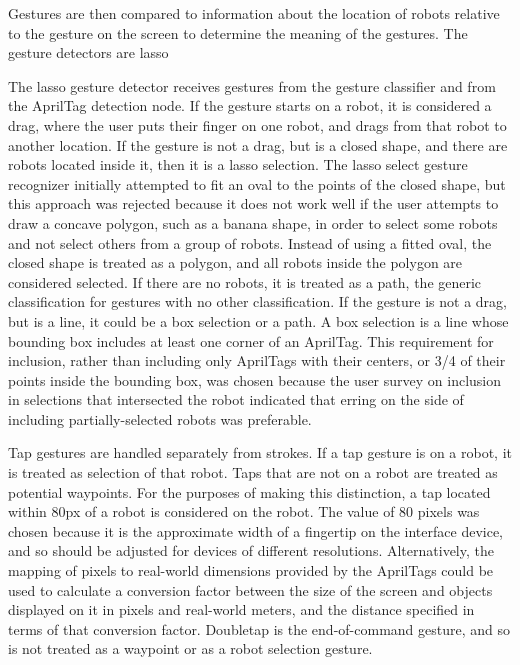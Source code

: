 Gestures are then compared to information about the location of robots relative to the gesture on the screen to determine the meaning of the gestures. 
The gesture detectors are lasso 

The lasso gesture detector receives gestures from the gesture classifier and from the AprilTag detection node. 
If the gesture starts on a robot, it is considered a drag, where the user puts their finger on one robot, and drags from that robot to another location. 
If the gesture is not a drag, but is a closed shape, and there are robots located inside it, then it is a lasso selection. 
The lasso select gesture recognizer initially attempted to fit an oval to the points of the closed shape, but this approach was rejected because it does not work well if the user attempts to draw a concave polygon, such as a banana shape, in order to select some robots and not select others from a group of robots. 
Instead of using a fitted oval, the closed shape is treated as a polygon, and all robots inside the polygon are considered selected. 
If there are no robots, it is treated as a path, the generic classification for gestures with no other classification. 
If the gesture is not a drag, but is a line, it could be a box selection or a path. 
A box selection is a line whose bounding box includes at least one corner of an AprilTag. 
This requirement for inclusion, rather than including only AprilTags with their centers, or 3/4 of their points inside the bounding box, was chosen because the user survey on inclusion in selections that intersected the robot indicated that erring on the side of including partially-selected robots was preferable. 

Tap gestures are handled separately from strokes. 
If a tap gesture is on a robot, it is treated as selection of that robot. 
Taps that are not on a robot are treated as potential waypoints. 
For the purposes of making this distinction, a tap located within 80px of a robot is considered on the robot. 
The value of 80 pixels was chosen because it is the approximate width of a fingertip on the interface device, and so should be adjusted for devices of different resolutions. 
Alternatively, the mapping of pixels to real-world dimensions provided by the AprilTags could be used to calculate a conversion factor between the size of the screen and objects displayed on it in pixels and real-world meters, and the distance specified in terms of that conversion factor. 
Doubletap is the end-of-command gesture, and so is not treated as a waypoint or as a robot selection gesture. 


